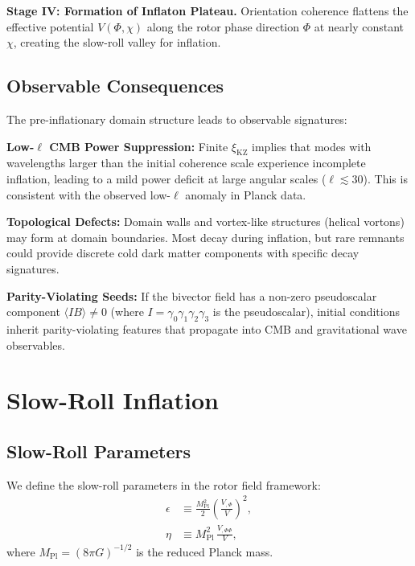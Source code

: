 \documentclass[11pt,a4paper]{article}
\numberwithin{equation}{section}
\theoremstyle{plain}
\theoremstyle{definition}
\theoremstyle{remark}
\begin{document}
\textbf{Stage IV: Formation of Inflaton Plateau.} Orientation coherence flattens the effective potential $V(\Phi,\chi)$ along the rotor phase direction $\Phi$ at nearly constant $\chi$, creating the slow-roll valley for inflation.

\subsection{Observable Consequences}

The pre-inflationary domain structure leads to observable signatures:

\textbf{Low-$\ell$ CMB Power Suppression:} Finite $\xi_{\mathrm{KZ}}$ implies that modes with wavelengths larger than the initial coherence scale experience incomplete inflation, leading to a mild power deficit at large angular scales ($\ell \lesssim 30$). This is consistent with the observed low-$\ell$ anomaly in Planck data.

\textbf{Topological Defects:} Domain walls and vortex-like structures (helical vortons) may form at domain boundaries. Most decay during inflation, but rare remnants could provide discrete cold dark matter components with specific decay signatures.

\textbf{Parity-Violating Seeds:} If the bivector field has a non-zero pseudoscalar component $\langle I B \rangle \neq 0$ (where $I = \gamma_0\gamma_1\gamma_2\gamma_3$ is the pseudoscalar), initial conditions inherit parity-violating features that propagate into CMB and gravitational wave observables.

\section{Slow-Roll Inflation}
\label{sec:slowroll}

\subsection{Slow-Roll Parameters}

We define the slow-roll parameters in the rotor field framework:
\begin{align}
\epsilon &\equiv \frac{M_{\mathrm{Pl}}^2}{2}\left(\frac{V_{,\Phi}}{V}\right)^2,\label{eq:epsilon}\\
\eta &\equiv M_{\mathrm{Pl}}^2\,\frac{V_{,\Phi\Phi}}{V},\label{eq:eta}
\end{align}
where $M_{\mathrm{Pl}} = (8\pi G)^{-1/2}$ is the reduced Planck mass.
\end{document}
